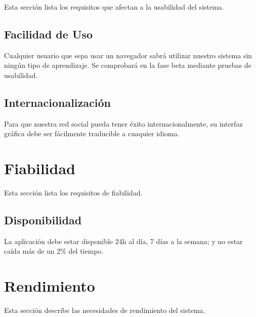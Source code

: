 \documentclass[12pt, a4paper, titlepage]{article}
\begin{document}
Esta sección lista los requisitos que afectan a la usabilidad del sistema.

\subsection{Facilidad de Uso}

Cualquier usuario que sepa usar un navegador sabrá utilizar nuestro sistema sin ningún tipo de aprendizaje. Se comprobará en la fase beta mediante pruebas de usabilidad.

\subsection{Internacionalización}

Para que nuestra red social pueda tener éxito internacionalmente, su interfaz gráfica debe ser fácilmente traducible a cuaquier idioma.

\section{Fiabilidad }

Esta sección lista los requisitos de fiabilidad.

\subsection{Disponibilidad}

La aplicación debe estar disponible 24h al día, 7 días a la semana; y no estar caída más de un 2\% del tiempo.

\section{Rendimiento}

Esta sección describe las necesidades de rendimiento del sistema.
\end{document}
